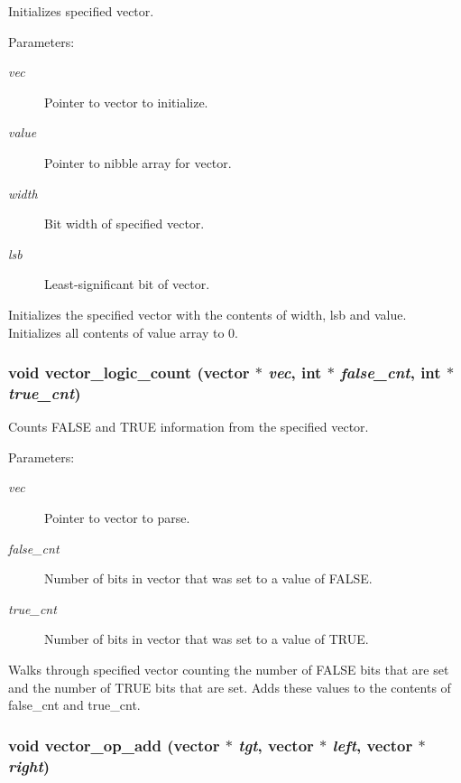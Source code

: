 Initializes specified vector.

\begin{Desc}
\item[Parameters: ]\par
\begin{description}
\item[{\em 
vec}]Pointer to vector to initialize. \item[{\em 
value}]Pointer to nibble array for vector. \item[{\em 
width}]Bit width of specified vector. \item[{\em 
lsb}]Least-significant bit of vector.\end{description}
\end{Desc}
Initializes the specified vector with the contents of width, lsb and value. Initializes all contents of value array to 0. 
\subsubsection{\setlength{\rightskip}{0pt plus 5cm}void vector\_\-logic\_\-count ({\bf vector} $\ast$ {\em vec}, int $\ast$ {\em false\_\-cnt}, int $\ast$ {\em true\_\-cnt})}\label{vector_8c_a23}


Counts FALSE and TRUE information from the specified vector.

\begin{Desc}
\item[Parameters: ]\par
\begin{description}
\item[{\em 
vec}]Pointer to vector to parse. \item[{\em 
false\_\-cnt}]Number of bits in vector that was set to a value of FALSE. \item[{\em 
true\_\-cnt}]Number of bits in vector that was set to a value of TRUE.\end{description}
\end{Desc}
Walks through specified vector counting the number of FALSE bits that are set and the number of TRUE bits that are set. Adds these values to the contents of false\_\-cnt and true\_\-cnt. 
\subsubsection{\setlength{\rightskip}{0pt plus 5cm}void vector\_\-op\_\-add ({\bf vector} $\ast$ {\em tgt}, {\bf vector} $\ast$ {\em left}, {\bf vector} $\ast$ {\em right})}\label{vector_8c_a37}


